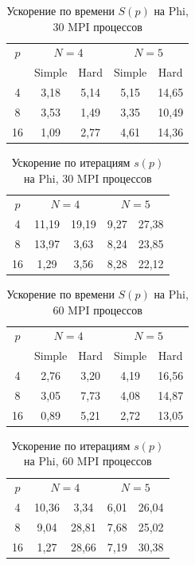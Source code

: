 \documentclass[a4paper]{article}
\begin{document}
\begin{table}
    \centering
    \begin{tabular}{|c|c|c|c|c|}
    \hline
    \(p\) & \multicolumn{2}{|c|}{\(N=4\)} & \multicolumn{2}{|c|}{\(N=5\)}\\ \cline{2-5}
    & Simple & Hard & Simple & Hard \\ \hline
	4 & 3,18 & 5,14 & 5,15 & 14,65 \\ \hline
	8 & 3,53 & 1,49 & 3,35 & 10,49 \\ \hline
	16 & 1,09 & 2,77 & 4,61 & 14,36 \\ \hline
    \end{tabular}
    \caption{Ускорение по времени \(S(p)\) на Phi, 30 MPI процессов}
    \label{table:time_speedUp_phi_30mpi}
\end{table}
\begin{table}
    \centering
    \begin{tabular}{|c|c|c|c|c|}
    \hline
    \(p\) & \multicolumn{2}{|c|}{\(N=4\)} & \multicolumn{2}{|c|}{\(N=5\)}\\ \cline{2-5}
	4 & 11,19 & 19,19 & 9,27 & 27,38 \\ \hline
	8 & 13,97 & 3,63 & 8,24 & 23,85 \\ \hline
	16 & 1,29 & 3,56 & 8,28 & 22,12 \\ \hline
	\end{tabular}
    \caption{Ускорение по итерациям \(s(p)\) на Phi, 30 MPI процессов}
    \label{table:iterations_speedUp_phi_30mpi}
\end{table}
\begin{table}
    \centering
    \begin{tabular}{|c|c|c|c|c|}
    \hline
    \(p\) & \multicolumn{2}{|c|}{\(N=4\)} & \multicolumn{2}{|c|}{\(N=5\)}\\ \cline{2-5}
    & Simple & Hard & Simple & Hard \\ \hline
	4 & 2,76 & 3,20 & 4,19 & 16,56 \\ \hline
	8 & 3,05 & 7,73 & 4,08 & 14,87 \\ \hline
	16 & 0,89 & 5,21 & 2,72 & 13,05 \\ \hline
    \end{tabular}
    \caption{Ускорение по времени \(S(p)\) на Phi, 60 MPI процессов}
    \label{table:time_speedUp_phi_60mpi}
\end{table}
\begin{table}
    \centering
    \begin{tabular}{|c|c|c|c|c|}
    \hline
    \(p\) & \multicolumn{2}{|c|}{\(N=4\)} & \multicolumn{2}{|c|}{\(N=5\)}\\ \cline{2-5}
	4 & 10,36 & 3,34 & 6,01 & 26,04 \\ \hline
	8 & 9,04 & 28,81 & 7,68 & 25,02 \\ \hline
	16 & 1,27 & 28,66 & 7,19 & 30,38 \\ \hline
	\end{tabular}
    \caption{Ускорение по итерациям \(s(p)\) на Phi, 60 MPI процессов}
    \label{table:iterations_speedUp_phi_60mpi}
\end{table}
\end{document}
